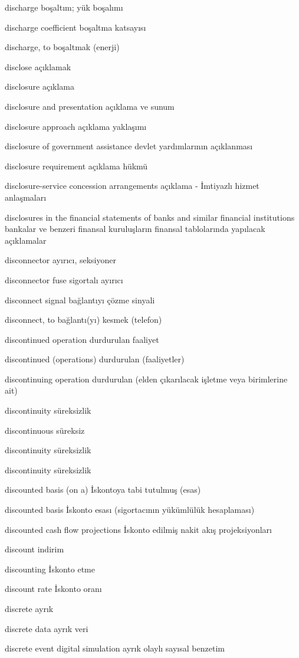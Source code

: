 \documentclass[12pt,fleqn]{article}\usepackage{../../common}
\begin{document}
discharge boşaltım; yük boşalımı

discharge coefficient boşaltma katsayısı

discharge, to boşaltmak (enerji)

disclose açıklamak

disclosure açıklama

disclosure and presentation açıklama ve sunum

disclosure approach açıklama yaklaşımı

disclosure of government assistance devlet yardımlarının açıklanması

disclosure requirement açıklama hükmü

disclosure-service concession arrangements açıklama - İmtiyazlı hizmet anlaşmaları

disclosures in the financial statements of banks and similar financial institutions bankalar ve benzeri finansal kuruluşların finansal tablolarında yapılacak açıklamalar

disconnector ayırıcı, seksiyoner

disconnector fuse sigortalı ayırıcı

disconnect signal bağlantıyı çözme sinyali

disconnect, to bağlantı(yı) kesmek (telefon)

discontinued operation durdurulan faaliyet

discontinued (operations) durdurulan (faaliyetler)

discontinuing operation durdurulan (elden çıkarılacak işletme veya birimlerine ait)

discontinuity süreksizlik

discontinuous süreksiz

discontinuity süreksizlik

discontinuity süreksizlik

discounted basis (on a) İskontoya tabi tutulmuş (esas)

discounted basis İskonto esası (sigortacının yükümlülük hesaplaması)

discounted cash flow projections İskonto edilmiş nakit akış projeksiyonları

discount indirim

discounting İskonto etme

discount rate İskonto oranı

discrete ayrık

discrete data ayrık veri

discrete event digital simulation ayrık olaylı sayısal benzetim
\end{document}
